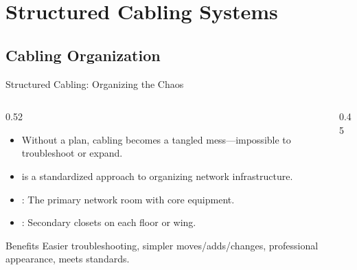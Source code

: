 \documentclass[aspectratio=169]{beamer}  %
\begin{document}
\section{Structured Cabling Systems}
\subsection{Cabling Organization}


\begin{frame}{Structured Cabling: Organizing the Chaos}
    \begin{columns}[T]
        \begin{column}{0.52\textwidth}
            \begin{itemize}
                \item Without a plan, cabling becomes a tangled mess---impossible to troubleshoot or expand.
                \item {} is a standardized approach to organizing network infrastructure.
                \item {}: The primary network room with core equipment.
                \item {}: Secondary closets on each floor or wing.
            \end{itemize}
            
            \vspace{0.3em}
            \begin{block}{Benefits}
                Easier troubleshooting, simpler moves/adds/changes, professional appearance, meets standards.
            \end{block}
        \end{column}
        \begin{column}{0.45\textwidth}
            \begin{center}
\end{center}
\end{column}
\end{columns}
\end{frame}
\end{document}
